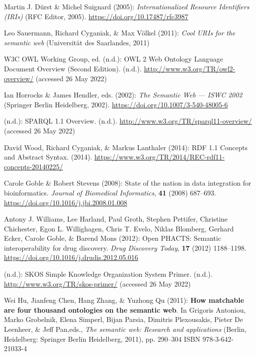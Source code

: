 \begin{thebibliography}{9}
Martin J. Dürst \& Michel Suignard (2005): \emph{Internationalized
{Resource Identifiers} ({IRIs})} ({RFC Editor}, 2005).
\url{https://doi.org/10.17487/rfc3987}

Leo Sauermann, Richard Cyganiak, \& Max Völkel (2011): \emph{Cool {URIs}
for the semantic web} ({Universität des Saarlandes}, 2011)

W3C OWL Working Group, ed. (n.d.): {OWL} 2 {Web Ontology Language
Document Overview} ({Second Edition}). (n.d.).
\url{http://www.w3.org/TR/owl2-overview/} (accessed 26 May 2022)

Ian Horrocks \& James Hendler, eds. (2002): \emph{The {Semantic Web} ---
{ISWC} 2002} ({Springer Berlin Heidelberg}, 2002).
\url{https://doi.org/10.1007/3-540-48005-6}

(n.d.): {SPARQL} 1.1 {Overview}. (n.d.).
\url{http://www.w3.org/TR/sparql11-overview/} (accessed 26 May 2022)

David Wood, Richard Cyganiak, \& Markus Lanthaler (2014): {RDF 1.1
Concepts and Abstract Syntax}. (2014).
\url{https://www.w3.org/TR/2014/REC-rdf11-concepts-20140225/}

Carole Goble \& Robert Stevens (2008): State of the nation in data
integration for bioinformatics. \emph{Journal of Biomedical
Informatics}, \textbf{41} (2008) 687--693.
\url{https://doi.org/10.1016/j.jbi.2008.01.008}

Antony J. Williams, Lee Harland, Paul Groth, Stephen Pettifer, Christine
Chichester, Egon L. Willighagen, Chris T. Evelo, Niklas Blomberg,
Gerhard Ecker, Carole Goble, \& Barend Mons (2012): Open {PHACTS}:
Semantic interoperability for drug discovery. \emph{Drug Discovery
Today}, \textbf{17} (2012) 1188--1198.
\url{https://doi.org/10.1016/j.drudis.2012.05.016}

(n.d.): {SKOS Simple Knowledge Organization System Primer}. (n.d.).
\url{http://www.w3.org/TR/skos-primer/} (accessed 26 May 2022)

Wei Hu, Jianfeng Chen, Hang Zhang, \& Yuzhong Qu (2011): \textbf{How
matchable are four thousand ontologies on the semantic web}. In Grigoris
Antoniou, Marko Grobelnik, Elena Simperl, Bijan Parsia, Dimitris
Plexousakis, Pieter De Leenheer, \& Jeff Pan,eds., \emph{The semantic
web: {Research} and applications} ({Berlin, Heidelberg}: {Springer
Berlin Heidelberg}, 2011), pp. 290--304 ISBN 978-3-642-21033-4


\end{thebibliography}
